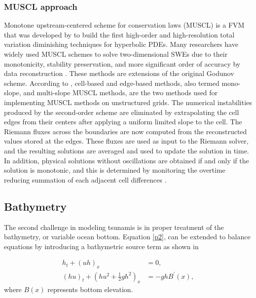 \documentclass[9pt,a4paper]{article}
\begin{document}
	\subsubsection{MUSCL approach}
	
	Monotone upstream-centered scheme for conservation laws (MUSCL) is a FVM that was developed by \citet{van1979towards} to build the first high-order and high-resolution total variation diminishing techniques for hyperbolic PDEs. Many researchers have widely used MUSCL schemes to solve two-dimensional SWEs due to their monotonicity, stability preservation, and more significant order of accuracy by data reconstruction \citep{song2011robust,zhao2019improved,marche2007evaluation,liang2009adaptive}.  These methods are extensions of the original Godunov scheme.     According to  \citet{hou20132d}, cell-based and edge-based methods, also termed mono-slope, and multi-slope MUSCL methods, are the two methods used for implementing MUSCL methods on unstructured grids. The numerical instabilities produced by the second-order scheme are eliminated by extrapolating the cell edges from their centers after applying a uniform limited slope to the cell. The Riemann fluxes across the boundaries are now computed from the reconstructed values stored at the edges.  These fluxes are used as input to the Riemann solver, and the resulting solutions are averaged and used to update the solution in time.  In addition, physical solutions without oscillations are obtained if and only if the solution is monotonic, and this is determined by monitoring the overtime reducing summation of each adjacent cell differences \citep{hou2014multislope}.
	
	
	
	
	
	
	\subsection{Bathymetry}
	The second challenge in modeling tsunamis is in proper treatment of the bathymetry, or variable ocean bottom. 
	Equation \eqref{p2}, can be extended to balance equations by introducing a bathymetric source term as shown in 
	
	\begin{equation}
		\begin{aligned}
			h_{t} + (uh)_x &= 0, \\
			(hu)_t + \left(hu^{2} + \frac{1}{2}gh^{2} \right)_x &= -ghB^{\prime}(x),
			\label{bst}
		\end{aligned}
	\end{equation}	
	where $B(x)$ represents bottom elevation. 
	
\end{document}
